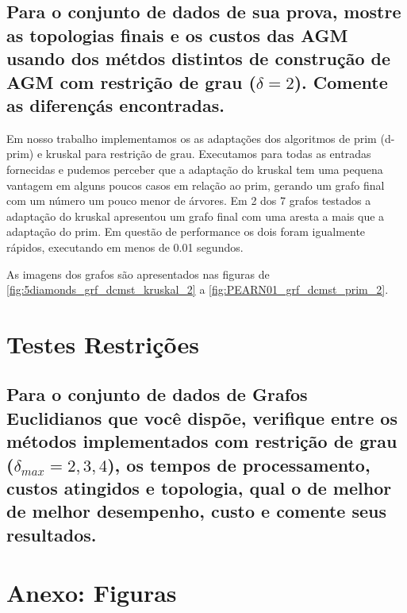 \documentclass[12pt,a4paper]{article}
\begin{document}
\subsection{Para o conjunto de dados de sua prova, mostre as topologias finais e
os custos das AGM usando dos métdos distintos de construção de AGM com restrição
de grau ($\delta=2$). Comente as diferençás encontradas.}

Em nosso trabalho implementamos os as adaptações dos algoritmos de prim (d-prim)
e kruskal para restrição de grau. Executamos para todas as entradas fornecidas e
pudemos perceber que a adaptação do kruskal tem uma pequena vantagem em alguns
poucos casos em relação ao prim, gerando um grafo final com um número um pouco
menor de árvores. Em 2 dos 7 grafos testados a adaptação do kruskal apresentou
um grafo final com uma aresta a mais que a adaptação do prim. Em questão de
performance os dois foram igualmente rápidos, executando em menos de 0.01
segundos.

As imagens dos grafos são apresentados nas figuras de
\ref{fig:5diamonds_grf_dcmst_kruskal_2} a \ref{fig:PEARN01_grf_dcmst_prim_2}.



\section{Testes Restrições}
\subsection{Para o conjunto de dados de Grafos Euclidianos que você dispõe,
verifique entre os métodos implementados com restrição de grau ($\delta_{max}=2,
3, 4$), os tempos de processamento, custos atingidos e topologia, qual o de
melhor de melhor desempenho, custo e comente seus resultados.}



\section{Anexo: Figuras}

\end{document}
